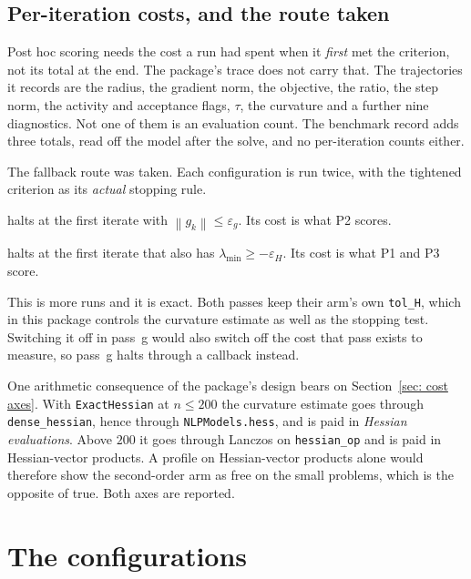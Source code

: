 \documentclass[11pt,a4paper]{article}
\providecommand{\norm}[1]{\left \lVert #1 \right \rVert}
\theoremstyle{remark}
\begin{document}
\subsection{Per-iteration costs, and the route taken}\label{sec: costs}

Post hoc scoring needs the cost a run had spent when it \emph{first} met the
criterion, not its total at the end. The package's trace does not carry that. The
trajectories it records are the radius, the gradient norm, the objective, the
ratio, the step norm, the activity and acceptance flags, $\tau$, the curvature
and a further nine diagnostics. Not one of them is an evaluation count. The benchmark record adds three totals, read off the model after the solve,
and no per-iteration counts either.

The fallback route was taken. Each configuration is run twice, with the tightened
criterion as its \emph{actual} stopping rule.

\begin{description}[leftmargin=2.2em, style=nextline]
  \item[Pass g] halts at the first iterate with $\norm{g_k} \leq \varepsilon_g$.
    Its cost is what P2 scores.
  \item[Pass h] halts at the first iterate that also has
    $\lambda_{\min} \geq -\varepsilon_H$. Its cost is what P1 and P3 score.
\end{description}

This is more runs and it is exact. Both passes keep their arm's own
\texttt{tol\_H}, which in this package controls the curvature estimate as well as
the stopping test. Switching it off in pass~g would also switch off the cost that
pass exists to measure, so pass~g halts through a callback instead.

One arithmetic consequence of the package's design bears on
Section~\ref{sec: cost axes}. With \texttt{ExactHessian} at $n \leq 200$ the
curvature estimate goes through \texttt{dense\_hessian}, hence through
\texttt{NLPModels.hess}, and is paid in \emph{Hessian evaluations}. Above $200$ it
goes through Lanczos on \texttt{hessian\_op} and is paid in Hessian-vector
products. A profile on Hessian-vector products alone would therefore show the
second-order arm as free on the small problems, which is the opposite of true.
Both axes are reported.

\section{The configurations}\label{sec: configs}
\end{document}

